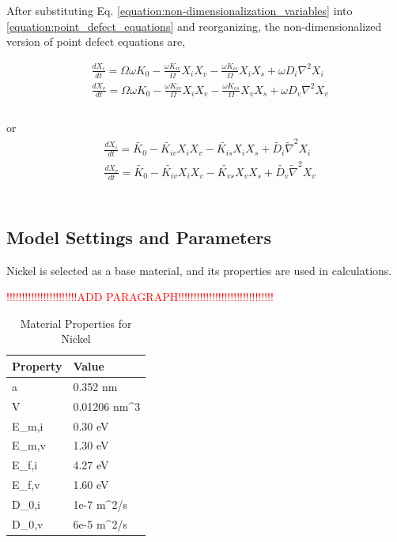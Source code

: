 \documentclass[a4paper]{article}
\begin{document}
After substituting Eq. \ref{equation:non-dimensionalization_variables} into \ref{equation:point_defect_equations} and reorganizing, the non-dimensionalized version of point defect equations are,

\begin{equation}
  \begin{aligned}
    &\frac{dX_i}{dt} = \Omega\omega K_0 - \frac{\omega K_{iv}}{\Omega}X_iX_v - \frac{\omega K_{is}}{\Omega}X_iX_s + \omega D_i\nabla^2 X_i\\
    &\frac{dX_v}{dt} = \Omega\omega K_0 - \frac{\omega K_{iv}}{\Omega}X_iX_v - \frac{\omega K_{vs}}{\Omega}X_vX_s + \omega D_v\nabla^2 X_v\\
  \end{aligned}
  \label{equation:non-dimensionalized_point_defect_equations}
\end{equation}\\
or
\begin{equation}
  \begin{aligned}
    &\frac{dX_i}{dt} = \widetilde{K_0} - \widetilde{K_{iv}}X_iX_v - \widetilde{K_{is}}X_iX_s + \widetilde{D_i}\widetilde{\nabla}^2 X_i\\
    &\frac{dX_v}{dt} = \widetilde{K_0} - \widetilde{K_{iv}}X_iX_v - \widetilde{K_{vs}}X_vX_s + \widetilde{D_v}\widetilde{\nabla}^2 X_v\\
  \end{aligned}
  \label{equation:non-dimensionalized_point_defect_equations}
\end{equation}\\

\subsection{Model Settings and Parameters} \hspace{10pt}
Nickel is selected as a base material, and its properties are used in calculations.

\textcolor{red}{!!!!!!!!!!!!!!!!!!!!!!!ADD PARAGRAPH!!!!!!!!!!!!!!!!!!!!!!!!!!!!!!!}

\begin{table}[h!]
  \centering
  \caption{Material Properties for Nickel\cite{walgraef1996}}
  \label{table:Ni_material_properties}
  \begin{tabular}{ ||p{2cm}|p{2cm}||  }
     \hline
     Property & Value\\
     \hline\hline
     a  & 0.352 nm\\
     V  & 0.01206 nm^3\\
     E_{m,i}  & 0.30 eV\\
     E_{m,v}  & 1.30 eV\\
     E_{f,i}  & 4.27 eV\\
     E_{f,v}  & 1.60 eV\\
     D_{0,i}  & 1e-7 m^2/s\\
     D_{0,v}  & 6e-5 m^2/s\\

     \hline
  \end{tabular}
\end{table}
\end{document}
